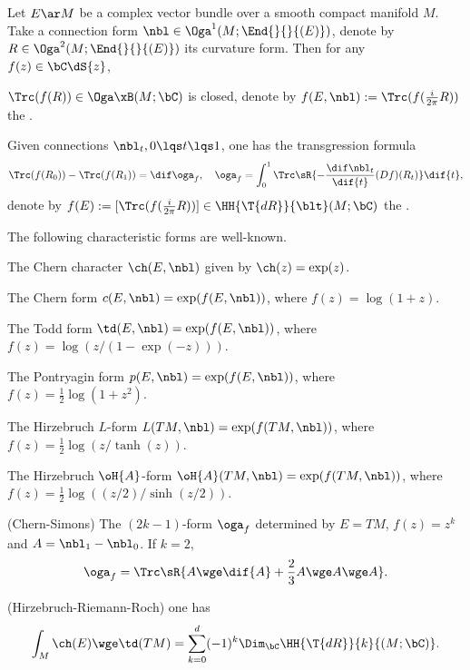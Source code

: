 \documentclass[a4paper, twoside]{article}
\begin{document}
\confighead{}{}{}



\begin{thm}
	Let $E\ar M$ be a complex vector bundle over a smooth compact manifold $M$. Take a connection form $\nbl\in\Oga^{1}(M;\End{}{}{(E)})$, denote by $R\in\Oga^{2}(M;\End{}{}{(E)})$ its curvature form. Then for any $f(z)\in\bC\dS{z}$,
	\begin{itm}
		\item $\Trc(f(R))\in\Oga\xB(M;\bC)$ is closed, denote by $f(E,\nbl):=\Trc(f(\frac{i}{2\pi}R))$ the .
		\item Given connections $\nbl_{t},0\lqs t\lqs 1$, one has the transgression formula
		\[
			\Trc(f(R_{0}))-\Trc(f(R_{1}))=\dif\oga_{f},\quad \oga_{f}=\int_{0}^{1}\Trc\sR{-\frac{\dif\nbl_{t}}{\dif{t}}(Df)(R_{t})}\dif{t},
		\]
        denote by $f(E):=[\Trc(f(\frac{i}{2\pi}R))]\in\HH{\T{dR}}{\blt}(M;\bC)$ the .
	\end{itm}
\end{thm}

\begin{exg}
    The following characteristic forms are well-known.
    \begin{itm}
        \item The Chern character $\ch(E,\nbl)$ given by $\ch(z)=\exp(z)$.
        \item The Chern form $c(E,\nbl)=\exp(f(E,\nbl))$, where $f(z)=\log(1+z)$.
        \item The Todd form $\td(E,\nbl)=\exp(f(E,\nbl))$, where $f(z)=\log(z/(1-\exp(-z)))$.
        \item The Pontryagin form $p(E,\nbl)=\exp(f(E,\nbl))$, where $f(z)=\frac{1}{2}\log(1+z^{2})$.
        \item The Hirzebruch $L$-form $L(TM,\nbl)=\exp(f(TM,\nbl))$, where $f(z)=\frac{1}{2}\log{(z/\tanh(z))}$.
        \item The Hirzebruch $\oH{A}$-form $\oH{A}(TM,\nbl)=\exp(f(TM,\nbl))$, where $f(z)=\frac{1}{2}\log{((z/2)/\sinh(z/2))}$.
        \item (Chern-Simons) The $(2k-1)$-form $\oga_{f}$ determined by $E=TM$, $f(z)=z^{k}$ and $A=\nbl_{1}-\nbl_{0}$. If $k=2$,
        \[
            \oga_{f}=\Trc\sR{A\wge\dif{A}+\frac{2}{3}A\wge A\wge A}.
        \]
        \item (Hirzebruch-Riemann-Roch) one has
        \[
            \int_{M}\ch(E)\wge\td(TM)=\sum_{k=0}^{d}(-1)^{k}\Dim_{\bC}\HH{\T{dR}}{k}{(M;\bC)}.
        \]
    \end{itm}
\end{exg}








\printref
\end{document}
